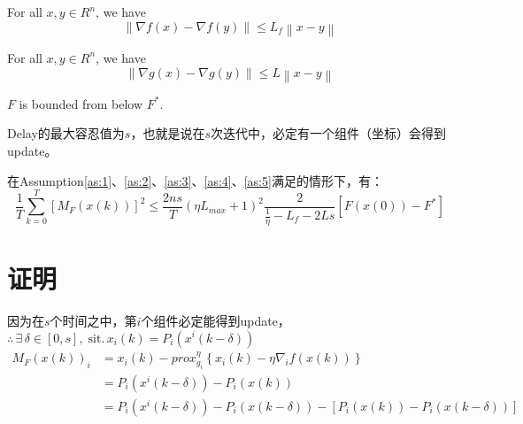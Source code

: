 \documentclass{ctexart}
\begin{document}
\begin{myas}\label{as:2}
For all $x,y \in R^n$, we have
    \begin{equation}\label{aseq:2}
      \left\| \nabla f\left(x\right) -\nabla f\left(y\right) \right\| \leq L_f \left\| x-y \right\|
    \end{equation}
\end{myas}

\begin{myas}\label{as:3}
For all $x,y \in R^n$, we have
    \begin{equation}\label{aseq:3}
      \left\| \nabla g\left(x\right) -\nabla g\left(y\right) \right\| \leq L \left\| x-y \right\|
    \end{equation}
\end{myas}

\begin{myas}\label{as:4}
    $F$ is bounded from below $F^*$.
\end{myas}

\begin{myas}\label{as:5}
    Delay的最大容忍值为$s$，也就是说在$s$次迭代中，必定有一个组件（坐标）会得到update。
\end{myas}

\begin{myth}\label{th:1}
    在Assumption\ref{as:1}、\ref{as:2}、\ref{as:3}、\ref{as:4}、\ref{as:5}满足的情形下，有：
    \begin{equation}\label{eq:7}
    \frac{1}{T}{\sum\limits_{k = 0}^T {\left[ {{M_F}\left( {x\left( k \right)} \right)} \right]} ^2} \leq \frac{2ns}{T}\left(\eta L_{max} + 1\right)^2 \frac{2}{\frac{1}{\eta}-L_f-2Ls} \left[F\left(x\left(0\right)\right) - F^* \right]
\end{equation}
\end{myth}

\newpage
\section{证明}

因为在$s$个时间之中，第$i$个组件必定能得到update，$\therefore \, \exists \, \delta\in \left[0,s\right],\; \text{sit.}\, x_i \left(k\right) = P_i \left(x^i \left(k-\delta \right)\right)$
\begin{align}\label{eq:8}
  M_F \left(x\left(k\right)\right)_i & = x_i \left(k\right) - prox_{g_i}^\eta \left\{x_i\left(k\right) - \eta \nabla_i f\left(x\left(k\right)\right)\right\} \nonumber\\
  & = P_i \left(x^i \left(k-\delta\right)\right) - P_i \left(x\left(k\right)\right) \nonumber \\
  & = P_i \left(x^i \left(k-\delta\right)\right) - P_i \left(x\left(k-\delta\right)\right) - \left[P_i \left(x\left(k\right)\right) - P_i \left(x\left(k-\delta\right)\right) \right]
\end{align}
\end{document}
